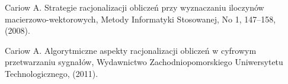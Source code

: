\documentclass{jtacs}
\numberwithin{equation}{section}
\begin{document}
\begin{thebibliography}{26}
 Cariow A. Strategie racjonalizacji oblicze\'{n} przy wyznaczaniu iloczyn\'{o}w macierzowo-wektorowych,
Metody Informatyki Stosowanej, No 1, 147--158, (2008).

 Cariow A. Algorytmiczne aspekty racjonalizacji oblicze\'{n} w cyfrowym przetwarzaniu
sygna\l{}\'{o}w, Wydawnictwo Zachodniopomorskiego Uniwersytetu Technologicznego, (2011).

\end{thebibliography}
\end{document}
